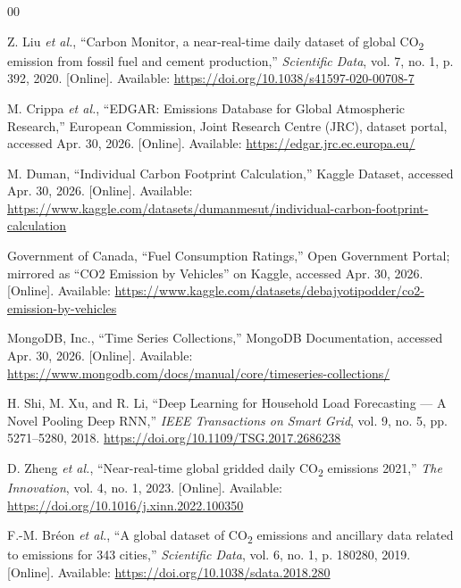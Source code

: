 \documentclass[conference]{IEEEtran}
\begin{document}
\begin{thebibliography}{00}

Z. Liu \textit{et al.}, ``Carbon Monitor, a near-real-time daily dataset of global CO\textsubscript{2} emission from fossil fuel and cement production,'' \textit{Scientific Data}, vol. 7, no. 1, p. 392, 2020. [Online]. Available: \url{https://doi.org/10.1038/s41597-020-00708-7}

M. Crippa \textit{et al.}, ``EDGAR: Emissions Database for Global Atmospheric Research,'' European Commission, Joint Research Centre (JRC), dataset portal, accessed Apr. 30, 2026. [Online]. Available: \url{https://edgar.jrc.ec.europa.eu/}

M. Duman, ``Individual Carbon Footprint Calculation,'' Kaggle Dataset, accessed Apr. 30, 2026. [Online]. Available: \url{https://www.kaggle.com/datasets/dumanmesut/individual-carbon-footprint-calculation}

Government of Canada, ``Fuel Consumption Ratings,'' Open Government Portal; mirrored as ``CO2 Emission by Vehicles'' on Kaggle, accessed Apr. 30, 2026. [Online]. Available: \url{https://www.kaggle.com/datasets/debajyotipodder/co2-emission-by-vehicles}

MongoDB, Inc., ``Time Series Collections,'' MongoDB Documentation, accessed Apr. 30, 2026. [Online]. Available: \url{https://www.mongodb.com/docs/manual/core/timeseries-collections/}

H. Shi, M. Xu, and R. Li, ``Deep Learning for Household Load Forecasting — A Novel Pooling Deep RNN,'' \textit{IEEE Transactions on Smart Grid}, vol. 9, no. 5, pp. 5271--5280, 2018. \url{https://doi.org/10.1109/TSG.2017.2686238}

D. Zheng \textit{et al.}, ``Near-real-time global gridded daily CO\textsubscript{2} emissions 2021,'' \textit{The Innovation}, vol. 4, no. 1, 2023. [Online]. Available: \url{https://doi.org/10.1016/j.xinn.2022.100350}

F.-M. Bréon \textit{et al.}, ``A global dataset of CO\textsubscript{2} emissions and ancillary data related to emissions for 343 cities,'' \textit{Scientific Data}, vol. 6, no. 1, p. 180280, 2019. [Online]. Available: \url{https://doi.org/10.1038/sdata.2018.280}

\end{thebibliography}
\end{document}
